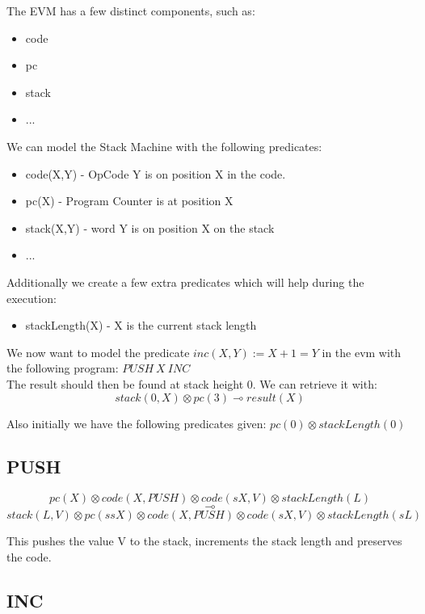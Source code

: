 \documentclass[sigconf]{acmart}
\begin{document}
The EVM has a few distinct components, such as:

\begin{itemize}
  \item code
  \item pc
  \item stack
  \item ...
\end{itemize}


We can model the Stack Machine with the following predicates:

\begin{itemize}
  \item code(X,Y) - OpCode Y is on position X in the code.
  \item pc(X) - Program Counter is at position X
  \item stack(X,Y) - word Y is on position X on the stack
  \item ...
\end{itemize}


Additionally we create a few extra predicates which will help during the execution:
\begin{itemize}
  \item stackLength(X) - X is the current stack length
\end{itemize}

We now want to model the predicate $inc(X,Y) := X + 1 = Y$ in the evm with the following program: $PUSH\ X\ INC$\\ The result should then be found at stack height 0. We can retrieve it with:
\[ stack(0, X) \otimes pc(3) \multimap result(X) \]


Also initially we have the following predicates given:
$pc(0) \otimes stackLength(0)$

\subsection*{PUSH}

  $$ pc(X)\otimes code(X, PUSH) \otimes code(sX, V)\otimes stackLength(L)$$
  $$\multimap$$
  $$stack(L, V)\otimes pc(ssX)\otimes code(X, PUSH)\otimes code(sX, V)\otimes stackLength(sL)$$

This pushes the value V to the stack, increments the stack length and preserves the code.

\subsection*{INC}
\end{document}
